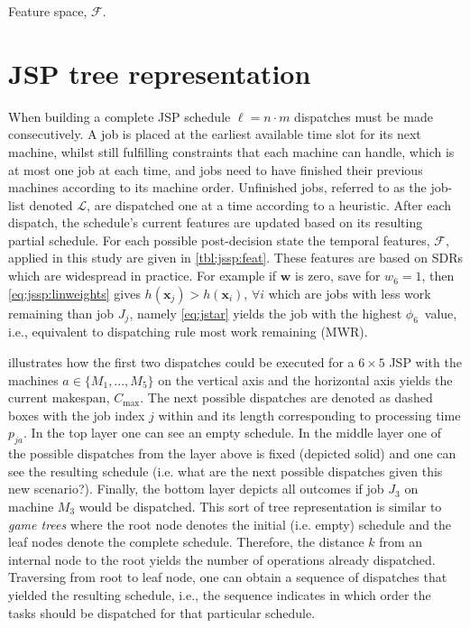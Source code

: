 \documentclass[smallextended]{llncs}
\renewcommand{\vec}[1]{\mathbf{#1}}
\newcommand{\phiwrmJob}{$\phi_6$}
\begin{document}
\begin{table}[t]  \centering
  \caption{Feature space, $\mathcal{F}$.}
  \label{tbl:jssp:feat}
  
\end{table}

\section{JSP tree representation}\label{sec:gametree}
When building a complete JSP schedule $\ell=n\cdot m$ dispatches must be made consecutively. 
A job is placed at the earliest available time slot for its next machine, whilst still fulfilling constraints that each machine can handle, which is at most one job at each time, and jobs need to have finished their previous machines according to its machine order. 
Unfinished jobs, referred to as the job-list denoted $\mathcal{L}$, are dispatched one at a time according to a heuristic. After each dispatch, the schedule's current features are updated based on its resulting partial schedule. 
For each possible post-decision state the temporal features, $\mathcal{F}$, applied in this study are given in \cref{tbl:jssp:feat}. These features are based on SDRs which are widespread in practice. For example if $\vec{w}$ is zero, save for $w_6=1$, then \cref{eq:jssp:linweights} gives $h(\vec{x}_j)>h(\vec{x}_i)$, 
$\forall i$ which are jobs with less work remaining than job $J_j$, namely \cref{eq:jstar} yields the job with the highest \phiwrmJob\ value, 
i.e., equivalent to dispatching rule most work remaining (MWR).


 illustrates how the first two dispatches could be executed for a $6\times 5$ JSP with the machines $a\in\{M_1,...,M_5\}$ on the vertical axis and the horizontal axis yields the current makespan, $C_{\max}$. The next possible dispatches are denoted as dashed boxes with the job index $j$ within and its length corresponding to processing time $p_{ja}$.
In the top layer one can see an empty schedule.
In the middle layer one of the possible dispatches from the layer above is fixed (depicted solid) and one can see the resulting 
schedule (i.e. what are the next possible dispatches given this new scenario?). 
Finally, the bottom layer depicts all outcomes if job $J_3$ on machine $M_3$ would be dispatched. 
This sort of tree representation is similar 
to \emph{game trees} \cite{vonNeumann44} where the root node denotes the initial (i.e. empty) schedule and the leaf nodes 
denote the complete schedule. Therefore, the distance $k$ from an internal node to the root yields the number of 
operations already dispatched. Traversing from root to leaf node, one can obtain a sequence of dispatches that yielded 
the resulting schedule, i.e., the sequence indicates in which order the tasks should be dispatched for that particular 
schedule. 
\end{document}
